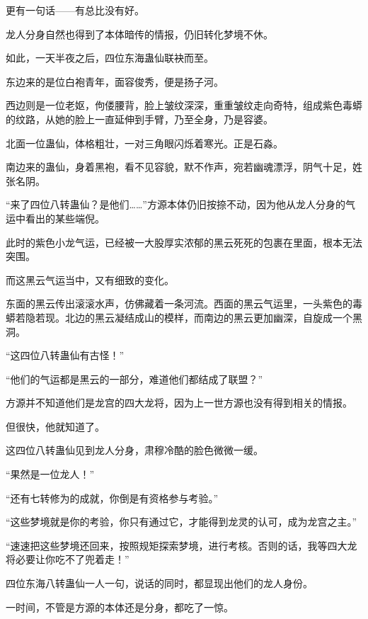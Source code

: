 \begin{this_body}
更有一句话——有总比没有好。

龙人分身自然也得到了本体暗传的情报，仍旧转化梦境不休。

如此，一天半夜之后，四位东海蛊仙联袂而至。

东边来的是位白袍青年，面容俊秀，便是扬子河。

西边则是一位老妪，佝偻腰背，脸上皱纹深深，重重皱纹走向奇特，组成紫色毒蟒的纹路，从她的脸上一直延伸到手臂，乃至全身，乃是容婆。

北面一位蛊仙，体格粗壮，一对三角眼闪烁着寒光。正是石淼。

南边来的蛊仙，身着黑袍，看不见容貌，默不作声，宛若幽魂漂浮，阴气十足，姓张名阴。

“来了四位八转蛊仙？是他们……”方源本体仍旧按捺不动，因为他从龙人分身的气运中看出的某些端倪。

此时的紫色小龙气运，已经被一大股厚实浓郁的黑云死死的包裹在里面，根本无法突围。

而这黑云气运当中，又有细致的变化。

东面的黑云传出滚滚水声，仿佛藏着一条河流。西面的黑云气运里，一头紫色的毒蟒若隐若现。北边的黑云凝结成山的模样，而南边的黑云更加幽深，自旋成一个黑洞。

“这四位八转蛊仙有古怪！”

“他们的气运都是黑云的一部分，难道他们都结成了联盟？”

方源并不知道他们是龙宫的四大龙将，因为上一世方源也没有得到相关的情报。

但很快，他就知道了。

这四位八转蛊仙见到龙人分身，肃穆冷酷的脸色微微一缓。

“果然是一位龙人！”

“还有七转修为的成就，你倒是有资格参与考验。”

“这些梦境就是你的考验，你只有通过它，才能得到龙灵的认可，成为龙宫之主。”

“速速把这些梦境还回来，按照规矩探索梦境，进行考核。否则的话，我等四大龙将必要让你吃不了兜着走！”

四位东海八转蛊仙一人一句，说话的同时，都显现出他们的龙人身份。

一时间，不管是方源的本体还是分身，都吃了一惊。

\end{this_body}

